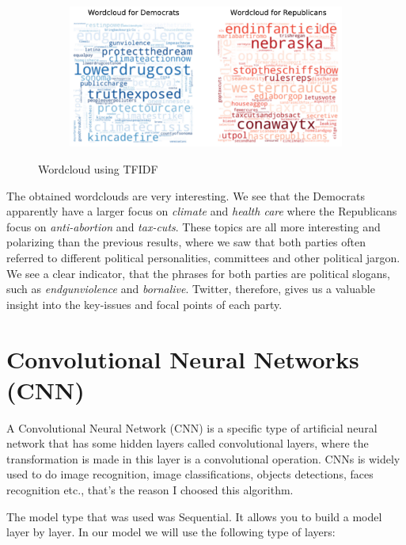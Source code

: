 \documentclass{article}
\begin{document}
\begin{figure}[H]
    \centering
    \begin{subfigure}{.8\textwidth}
        \centering
        \includegraphics[width=1\textwidth]{./img/WordCloudTFIDF.pdf}
    \end{subfigure}
    \caption{Wordcloud using TFIDF}
    \label{fig:WordCloudTFIDF}
\end{figure}


The obtained wordclouds are very interesting. We see that the Democrats apparently have a larger focus on \textit{climate} and \textit{health care} where the Republicans focus on \textit{anti-abortion} and \textit{tax-cuts}. These topics are all more interesting and polarizing than the previous results, where we saw that both parties often referred to different political personalities, committees and other political jargon. We see a clear indicator, that the phrases for both parties are political slogans, such as \textit{endgunviolence} and \textit{bornalive}. Twitter, therefore, gives us a valuable insight into the key-issues and focal points of each party.

\section{Convolutional Neural Networks (CNN)}
\label{CNN}

A Convolutional Neural Network (CNN) is a specific type of artificial neural network that has some hidden layers called convolutional layers, where the transformation is made in this layer is a convolutional operation. CNNs is widely used to do image recognition, image classifications, objects detections, faces recognition etc., that's the reason I choosed this algorithm.

The model type that was used was Sequential. It allows you to build a model layer by layer. In our model we will use the following type of layers:
\end{document}
